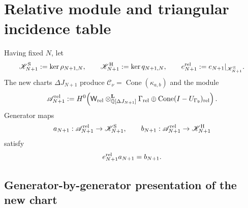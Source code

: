 \section{Relative module and triangular incidence table}

Having fixed $N$, let
\begin{equation}\label{eq:pdf2-hodge-kernels}
 \mathscr K^{\rm S}_{N+1}:=\ker\rho_{N+1,N},
 \qquad
 \mathscr K^{\rm H}_{N+1}:=\ker q_{N+1,N},
 \qquad
 e_{N+1}^{\rm rel}:=e_{N+1}|_{\mathscr K^{\rm S}_{N+1}}.
\end{equation}
The new charts $\Delta J_{N+1}$ produce
$\mathcal C_\nu=\operatorname{Cone}(\kappa_{a,b})$ and the module
\begin{equation}\label{eq:pdf2-hodge-a-rel}
 \mathscr A_{N+1}^{\rm rel}:=
 H^0\!\left(
  \mathsf W_{\rm rel}\otimes^{\mathbf L}_{\mathbb Q[\Delta J_{N+1}]}
  \Gamma_{\rm rel}
  \oplus\operatorname{Cone}(I-U_{\Gamma_9})_{\rm rel}
 \right).
\end{equation}
Generator maps
\begin{equation}\label{eq:pdf2-hodge-mapas-relativos}
 a_{N+1}:\mathscr A_{N+1}^{\rm rel}\to\mathscr K^{\rm S}_{N+1},
 \qquad
 b_{N+1}:\mathscr A_{N+1}^{\rm rel}\to\mathscr K^{\rm H}_{N+1}
\end{equation}
satisfy
\begin{equation}\label{eq:pdf2-hodge-factorizacion-relativa}
 e_{N+1}^{\rm rel}a_{N+1}=b_{N+1}.
\end{equation}

\subsection{Generator-by-generator presentation of the new chart}

